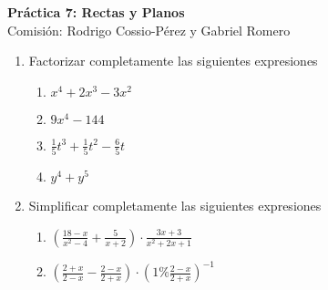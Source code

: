 \documentclass[a4paper]{article}
\newcommand{\exercise}{\item}
\newcommand{\df}[2]{\displaystyle\frac{#1}{#2}}
\begin{document}
\noindent \hrulefill 
\vspace{-7pt}
\begin{center} 
	\textbf{ Práctica 7: Rectas y Planos } \\
	Comisión: Rodrigo Cossio-Pérez y Gabriel Romero
\end{center}
\vspace{-10pt}
\hrulefill


\begin{enumerate}

	\exercise Factorizar completamente las siguientes expresiones
	\begin{enumerate} [label=(\alph*)]
		\item $x^4+2x^3-3x^2$
		\item $9x^4-144$
		\item $\df{1}{5}t^3+\df{1}{5}t^2-\df{6}{5}t$
		\item $y^4+y^5$

	\end{enumerate}

	\exercise Simplificar completamente las siguientes expresiones
	\begin{enumerate} [label=(\alph*)]
		\item $\left(\df{18-x}{x^2-4}+\df{5}{x+2}\right)\cdot \df{3x+3}{x^2+2x+1}$
		\item $\left(\df{2+x}{2-x}-\df{2-x}{2+x}\right)\cdot \left(1\%\df{2-x}{2+x}\right)^{-1}$
	\end{enumerate}

\end{enumerate}
\end{document}
